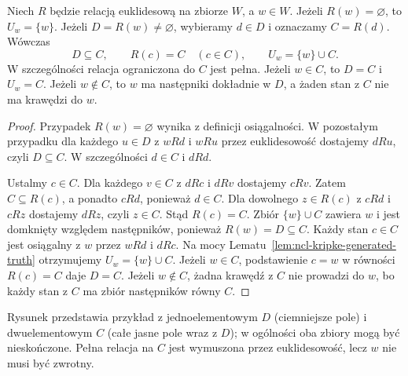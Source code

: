 \begin{lemat}
\label{lem:ncl-kripke-euclidean-cluster}
Niech $R$ będzie relacją euklidesową
na zbiorze $W$, a $w\in W$.
Jeżeli $R(w)=\varnothing$, to $U_w=\{w\}$.
Jeżeli $D=R(w)\ne\varnothing$, wybieramy
$d\in D$ i oznaczamy $C=R(d)$.
Wówczas
\[
 D\subseteq C,\qquad
 R(c)=C\quad(c\in C),\qquad
 U_w=\{w\}\cup C.
\]
W szczególności relacja ograniczona do $C$
jest pełna. Jeżeli $w\in C$, to $D=C$
i $U_w=C$. Jeżeli $w\notin C$, to $w$
ma następniki dokładnie w $D$, a żaden
stan z $C$ nie ma krawędzi do $w$.
\end{lemat}
\begin{proof}
Przypadek $R(w)=\varnothing$ wynika z definicji
osiągalności.
W pozostałym przypadku dla każdego $u\in D$
z $wRd$ i $wRu$ przez euklidesowość dostajemy
$dRu$, czyli $D\subseteq C$. W szczególności
$d\in C$ i $dRd$.

Ustalmy $c\in C$. Dla każdego $v\in C$
z $dRc$ i $dRv$ dostajemy $cRv$.
Zatem $C\subseteq R(c)$, a ponadto $cRd$,
ponieważ $d\in C$. Dla dowolnego $z\in R(c)$
z $cRd$ i $cRz$ dostajemy $dRz$,
czyli $z\in C$. Stąd $R(c)=C$.
Zbiór $\{w\}\cup C$ zawiera $w$ i jest
domknięty względem następników, ponieważ
$R(w)=D\subseteq C$. Każdy stan $c\in C$
jest osiągalny z $w$ przez $wRd$ i $dRc$.
Na mocy Lematu~\ref{lem:ncl-kripke-generated-truth}
otrzymujemy $U_w=\{w\}\cup C$.
Jeżeli $w\in C$, podstawienie $c=w$
w równości $R(c)=C$ daje $D=C$.
Jeżeli $w\notin C$, żadna krawędź
z $C$ nie prowadzi do $w$, bo każdy stan
z $C$ ma zbiór następników równy $C$.
\end{proof}

\begin{center}
\end{center}
Rysunek przedstawia przykład z jednoelementowym
$D$ (ciemniejsze pole) i dwuelementowym $C$
(całe jasne pole wraz z $D$); w ogólności oba
zbiory mogą być nieskończone.
Pełna relacja na $C$ jest wymuszona przez
euklidesowość, lecz $w$ nie musi być zwrotny.

